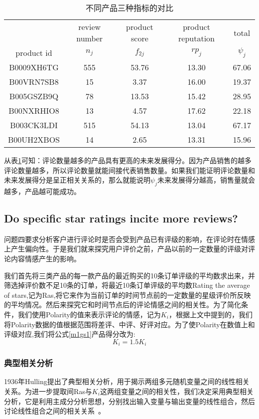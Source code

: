 \documentclass[UTF8]{article}
\newcommand{\upcite}[1]{\textsuperscript{\textsuperscript{\cite{#1}}}}
\begin{document}
\begin{table}[H]	
	\caption{不同产品三种指标的对比}\label{biao4q1}
	\centering
\begin{tabular}{c|cccc}
	\hline &review number & product score  & product reputation  & total  \\
	 product id &$n_j$ & $f_{2j}$ & $rp_{j}$ & $\psi_j$ \\
	\hline B0009XH6TG & 555 & 53.76 & 13.30 & 67.06 \\
	B00VRN7SB8 & 15 & 3.37 & 16.00 & 19.37 \\
	B005GSZB9Q & 78 & 13.53 & 15.42 & 28.95 \\
	B00NXRHIO8 & 13 & 4.57 & 17.62 & 22.18 \\
	B003CK3LDI & 515 & 54.13 & 13.04 & 67.17 \\
	B00UH2XBOS & 14 & 2.65 & 13.31 & 15.96 \\
	\hline
\end{tabular}
\end{table}

从表\ref{biao4q1}可知：评论数量越多的产品具有更高的未来发展得分。因为产品销售的越多评论数量越多，所以评论数量就能间接代表销售数量。如果我们能证明评论数量和未来发展得分是呈正相关关系的，那么就能说明$\psi_j$未来发展得分越高，销售量就会越多，产品越可能成功。

\subsection{Do specific star ratings incite more reviews?}
问题四要求分析客户进行评论时是否会受到产品已有评级的影响，在评论时在情感上产生偏向性。于是我们就来探究用户评价之前，产品以前的一定数量的评级对评论内容情感产生的影响。

我们首先将三类产品的每一款产品的最近购买的10条订单评级的平均数求出来，并筛选掉评价数不足10条的订单，将最近10条订单评级的平均数Rating the average of stars,记为Ras,将它来作为当前订单的时间节点前的一定数量的星级评价所反映的平均情况。然后来探究它和时间节点后的评论情感之间的相关性。为了简化条件，我们使用Polarity的值来表示评论的情感，记为\(K_{i}\)，根据上文中提到的，我们将Polarity数据的值根据范围将差评、中评、好评对应。为了使Polarity在数值上和评级对应,我们将公式\ref{m1gs1}产品得分改为:
\begin{equation}\label{q5gs1}
K_i=1.5K_i
\end{equation}

\subsubsection*{典型相关分析}
1936年Hulling提出了典型相关分析，用于揭示两组多元随机变量之间的线性相关关系。为进一步提取间Ras与\(K_{i}\)这两组变量之间的相关性，我们决定采用典型相关分析，它是利用主成分分析思想，分别找出输入变量与输出变量的线性组合，然后讨论线性组合之间的相关关系~\upcite{jj}。
\end{document}
